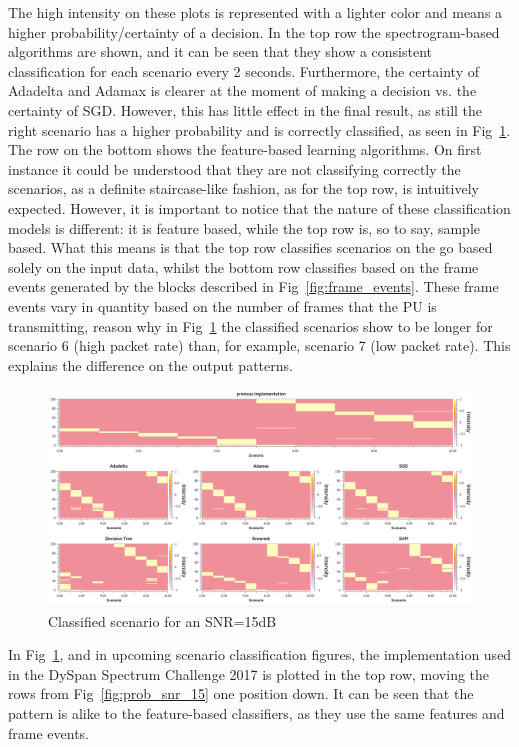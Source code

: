 The high intensity on these plots is represented with a lighter color and means a higher probability/certainty of a decision. In the top row the spectrogram-based algorithms are shown, and it can be seen that they show a consistent classification for each scenario every 2 seconds. Furthermore, the certainty of Adadelta and Adamax is clearer at the moment of making a decision vs. the certainty of SGD. However, this has little effect in the final result, as still the right scenario has a higher probability and is correctly classified, as seen in Fig~\ref{fig:scn_snr_15}. The row on the bottom shows the feature-based learning algorithms. On first instance it could be understood that they are not classifying correctly the scenarios, as a definite staircase-like fashion, as for the top row, is intuitively expected. However, it is important to notice that the nature of these classification models is different: it is feature based, while the top row is, so to say, sample based. What this means is that the top row classifies scenarios on the go based solely on the input data, whilst the bottom row classifies based on the frame events generated by the blocks described in Fig~\ref{fig:frame_events}. These frame events vary in quantity based on the number of frames that the \ac{PU} is transmitting, reason why in Fig~\ref{fig:scn_snr_15} the classified scenarios show to be longer for scenario 6 (high packet rate) than, for example, scenario 7 (low packet rate). This explains the difference on the output patterns.

\begin{figure}[!htb]
    \centering
      \includegraphics[width=\textwidth]{figures/scn_snr_15}
      \caption{Classified scenario for an SNR=15dB}
      \label{fig:scn_snr_15}
\end{figure}

In Fig~\ref{fig:scn_snr_15}, and in upcoming scenario classification figures, the implementation used in the DySpan Spectrum Challenge 2017 is plotted in the top row, moving the rows from Fig~\ref{fig:prob_snr_15} one position down. It can be seen that the pattern is alike to the feature-based classifiers, as they use the same features and frame events.


